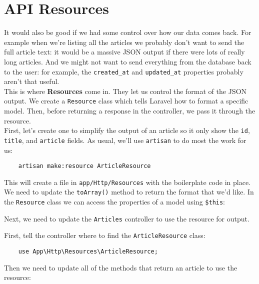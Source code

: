 \section{API Resources}

It would also be good if we had some control over how our data comes back. For example when we're listing all the articles we probably don't want to send the full article text: it would be a massive JSON output if there were lots of really long articles. And we might not want to send everything from the database back to the user: for example, the \texttt{created\_at} and \texttt{updated\_at} properties probably aren't that useful.
\\

This is where \textbf{Resources} come in. They let us control the format of the JSON output. We create a \texttt{Resource} class which tells Laravel how to format a specific model. Then, before returning a response in the controller, we pass it through the resource.
\\

First, let's create one to simplify the output of an article so it only show the \texttt{id}, \texttt{title}, and \texttt{article} fields. As usual, we'll use \texttt{artisan} to do most the work for us:

\begin{verbatim}
    artisan make:resource ArticleResource
\end{verbatim}

This will create a file in \texttt{app/Http/Resources} with the boilerplate code in place. We need to update the \texttt{toArray()} method to return the format that we'd like. In the \texttt{Resource} class we can access the properties of a model using \texttt{\$this}:


Next, we need to update the \texttt{Articles} controller to use the resource for output.

\pagebreak

First, tell the controller where to find the \texttt{ArticleResource} class:

\begin{verbatim}
    use App\Http\Resources\ArticleResource;
\end{verbatim}

Then we need to update all of the methods that return an article to use the resource:


